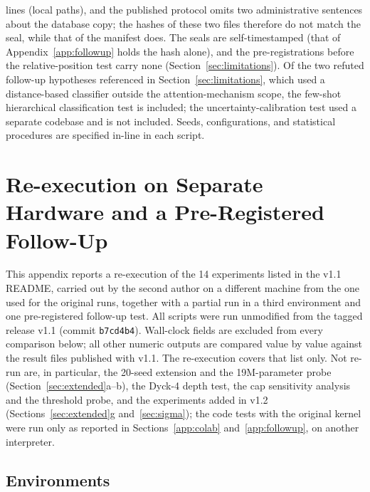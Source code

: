 \documentclass[11pt]{article}
\begin{document}
lines (local paths), and the published protocol omits two administrative sentences about the database copy; the hashes of these two files therefore do not match the seal, while that of the manifest does. The seals are self-timestamped (that of Appendix~\ref{app:followup} holds the hash alone), and the pre-registrations before the relative-position test carry none (Section~\ref{sec:limitations}). Of the two refuted follow-up hypotheses referenced in Section~\ref{sec:limitations}, which used a distance-based classifier outside the attention-mechanism scope, the few-shot hierarchical classification test is included; the uncertainty-calibration test used a separate codebase and is not included. Seeds, configurations, and statistical procedures are specified in-line in each script.

\appendix
\section{Re-execution on Separate Hardware and a Pre-Registered Follow-Up}\label{app:repro}

This appendix reports a re-execution of the 14 experiments listed in the v1.1 README, carried out by the second author on a different machine from the one used for the original runs, together with a partial run in a third environment and one pre-registered follow-up test. All scripts were run unmodified from the tagged release v1.1 (commit \texttt{b7cd4b4}). Wall-clock fields are excluded from every comparison below; all other numeric outputs are compared value by value against the result files published with v1.1. The re-execution covers that list only. Not re-run are, in particular, the 20-seed extension and the 19M-parameter probe (Section~\ref{sec:extended}a--b), the Dyck-4 depth test, the cap sensitivity analysis and the threshold probe, and the experiments added in v1.2 (Sections~\ref{sec:extended}g and~\ref{sec:sigma}); the code tests with the original kernel were run only as reported in Sections~\ref{app:colab} and~\ref{app:followup}, on another interpreter.

\subsection{Environments}\label{app:env}
\end{document}
